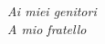 \thispagestyle{empty}
\begin{flushright}
\vspace*{3.0cm}
{\large \textit{Ai miei genitori}} \\ 
{\large \textit{A mio fratello}}
\end{flushright}
